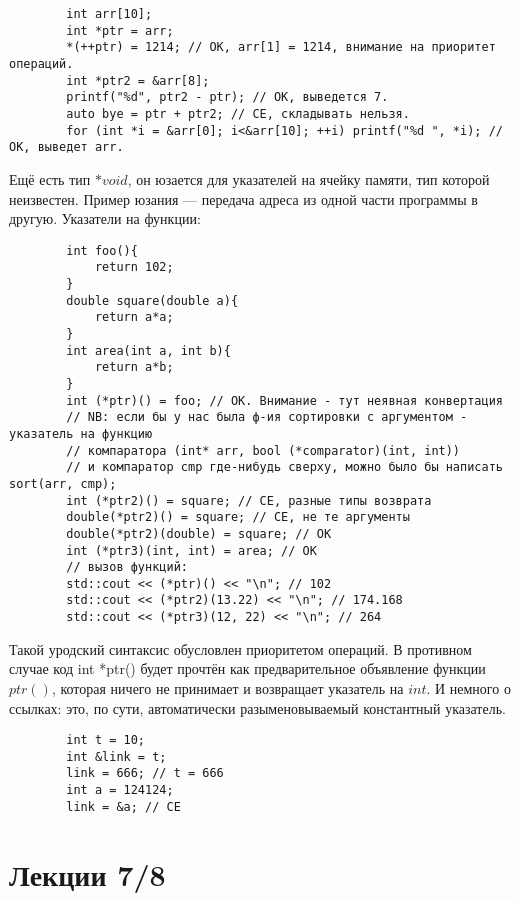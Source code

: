 \documentclass[15pt, a4paper]{article}
\newcommand{\nl}{\newline}
\begin{document}
    \begin{verbatim}
        int arr[10];
        int *ptr = arr;
        *(++ptr) = 1214; // OK, arr[1] = 1214, внимание на приоритет операций.
        int *ptr2 = &arr[8];
        printf("%d", ptr2 - ptr); // OK, выведется 7.
        auto bye = ptr + ptr2; // CE, складывать нельзя.
        for (int *i = &arr[0]; i<&arr[10]; ++i) printf("%d ", *i); // OK, выведет arr.
    \end{verbatim}
    Ещё есть тип $*void$, он юзается для указателей на ячейку памяти, тип которой неизвестен. Пример юзания --- передача адреса из одной части программы в другую. \nl
    Указатели на функции:
    \begin{verbatim}
        int foo(){
            return 102;
        }
        double square(double a){
            return a*a;
        }    
        int area(int a, int b){
            return a*b;
        }
        int (*ptr)() = foo; // OK. Внимание - тут неявная конвертация
        // NB: если бы у нас была ф-ия сортировки с аргументом - указатель на функцию 
        // компаратора (int* arr, bool (*comparator)(int, int))
        // и компаратор cmp где-нибудь сверху, можно было бы написать sort(arr, cmp);
        int (*ptr2)() = square; // CE, разные типы возврата
        double(*ptr2)() = square; // CE, не те аргументы
        double(*ptr2)(double) = square; // OK
        int (*ptr3)(int, int) = area; // OK
        // вызов функций:
        std::cout << (*ptr)() << "\n"; // 102
        std::cout << (*ptr2)(13.22) << "\n"; // 174.168
        std::cout << (*ptr3)(12, 22) << "\n"; // 264
    \end{verbatim}
    Такой уродский синтаксис обусловлен приоритетом операций. В противном случае код int *ptr() будет прочтён как предварительное объявление
    функции $ptr()$, которая ничего не принимает и возвращает указатель на $int$. \nl
    И немного о ссылках: это, по сути, автоматически разыменовываемый константный указатель.
    \begin{verbatim}
        int t = 10;
        int &link = t;
        link = 666; // t = 666
        int a = 124124;
        link = &a; // CE
    \end{verbatim}
    \newpage

    \section{Лекции 7/8}
\end{document}
